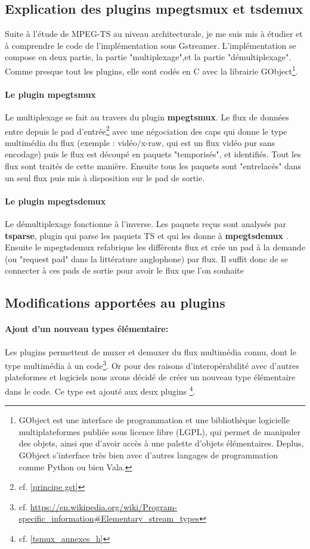 \subsection{Explication des plugins mpegtsmux et tsdemux}
Suite à l'étude de MPEG-TS au niveau architecturale, je me suis mis à étudier et à comprendre le code de l'implémentation sous Gstreamer. L'implémentation se compose en deux partie,
la partie "multiplexage",et la partie "démultiplexage". Comme presque tout les plugins, elle sont codés en C avec la librairie GObject\footnote{GObject est une interface de programmation et une bibliothèque logicielle multiplateformes publiée sous licence libre (LGPL), qui permet de manipuler des objets, ainsi que d'avoir accès à une palette d'objets élémentaires. Deplus, GObject s'interface très bien avec d'autres langages de programmation comme Python ou bien Vala.}.\\
  \paragraph{Le plugin mpegtsmux}
Le multiplexage se fait au travers du plugin \textbf{mpegtsmux}. Le flux de données entre depuis le pad d'entrée\footnote{cf. \ref{principe gst}} avec une négociation des caps qui donne le type multimédia du flux (exemple : vidéo/x-raw, qui est un flux vidéo pur sans encodage) puis le flux est découpé en paquets "temporisés", et identifiés. Tout les flux sont traités de cette manière. Ensuite tous les paquets sont "entrelacés" dans un seul flux puis mis à disposition sur le pad de sortie.
  \paragraph{Le plugin mpegtsdemux}
Le démultiplexage fonctionne à l'inverse. Les paquets reçus sont analysés par \textbf{tsparse}, plugin qui parse les paquets TS et qui les donne à \textbf{mpegtsdemux} . Ensuite le mpegtsdemux refabrique les différents flux et crée un pad à la demande (ou "request pad" dans la littérature anglophone) par flux. Il suffit donc de se connecter à ces pads de sortie pour avoir le flux que l'on souhaite

\subsection{Modifications apportées au plugins}

\paragraph{Ajout d'un nouveau types élémentaire:} Les plugins permettent de muxer et demuxer du flux multimédia connu, dont le type multimédia à un code\footnote{cf. \url{https://en.wikipedia.org/wiki/Program-specific_information#Elementary_stream_types}}. Or pour des raisons d'interopérabilité avec d'autres plateformes et logiciels nous avons décidé de créer un nouveau type élémentaire dans le code. Ce type est ajouté aux deux plugins \footnote{cf. \ref{tsmux_annexes_h}}.
